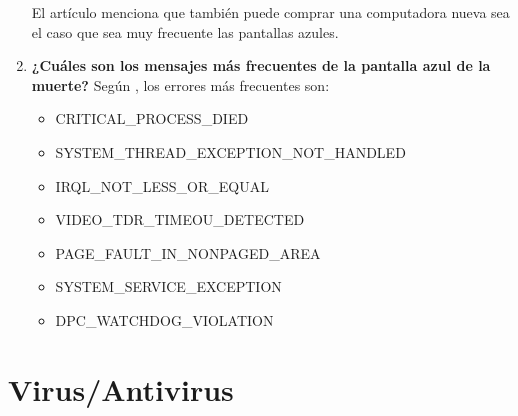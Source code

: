 \documentclass[stu, 12pt, letterpaper, donotrepeattitle, floatsintext, natbib, helv]{apa7}
\begin{document}
\begin{enumerate}
    El artículo menciona que también puede comprar una computadora nueva sea el caso que sea muy frecuente las pantallas azules.

    \item \textbf{¿Cuáles son los mensajes más frecuentes de la pantalla azul de la muerte?}
    Según \cite{CommonErrorCodes}, los errores más frecuentes son:
    \begin{itemize}
        \item CRITICAL\_PROCESS\_DIED
        \item SYSTEM\_THREAD\_EXCEPTION\_NOT\_HANDLED
        \item IRQL\_NOT\_LESS\_OR\_EQUAL
        \item VIDEO\_TDR\_TIMEOU\_DETECTED
        \item PAGE\_FAULT\_IN\_NONPAGED\_AREA
        \item SYSTEM\_SERVICE\_EXCEPTION
        \item DPC\_WATCHDOG\_VIOLATION
    \end{itemize}
\end{enumerate}

\section*{Virus/Antivirus}
{}

\end{document}
